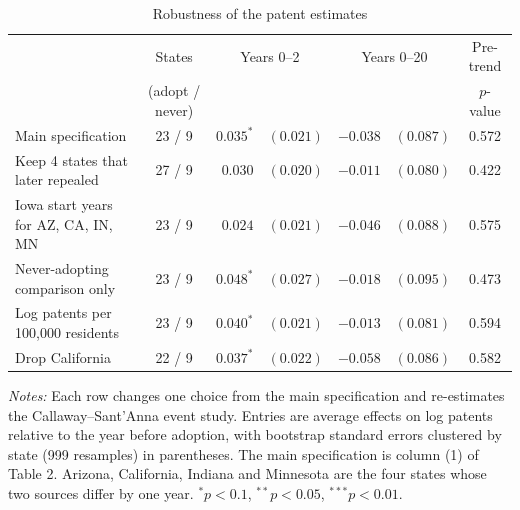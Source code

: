 \begin{table}[t]
\centering
\caption{Robustness of the patent estimates}
\label{tab:robustness}
\small
\begin{threeparttable}
\begin{tabular}{lcr@{\,}lr@{\,}lc}
\toprule
 & States & \multicolumn{2}{c}{Years 0--2} & \multicolumn{2}{c}{Years 0--20} & Pre-trend \\
 & (adopt / never) & \multicolumn{2}{c}{} & \multicolumn{2}{c}{} & $p$-value \\
\midrule
Main specification & 23 / 9 & $0.035^{*}$ & $(0.021)$ & $-0.038$ & $(0.087)$ & 0.572 \\
Keep 4 states that later repealed & 27 / 9 & $0.030$ & $(0.020)$ & $-0.011$ & $(0.080)$ & 0.422 \\
Iowa start years for AZ, CA, IN, MN & 23 / 9 & $0.024$ & $(0.021)$ & $-0.046$ & $(0.088)$ & 0.575 \\
Never-adopting comparison only & 23 / 9 & $0.048^{*}$ & $(0.027)$ & $-0.018$ & $(0.095)$ & 0.473 \\
Log patents per 100,000 residents & 23 / 9 & $0.040^{*}$ & $(0.021)$ & $-0.013$ & $(0.081)$ & 0.594 \\
Drop California & 22 / 9 & $0.037^{*}$ & $(0.022)$ & $-0.058$ & $(0.086)$ & 0.582 \\
\bottomrule
\end{tabular}
\begin{tablenotes}[flushleft]\footnotesize
\item \textit{Notes:} Each row changes one choice from the main specification and re-estimates the
Callaway--Sant'Anna event study. Entries are average effects on log patents relative to the year before
adoption, with bootstrap standard errors clustered by state (999 resamples) in parentheses.
The main specification is column (1) of Table 2. Arizona, California, Indiana and Minnesota are the four
states whose two sources differ by one year. $^{*}p<0.1$, $^{**}p<0.05$, $^{***}p<0.01$.
\end{tablenotes}
\end{threeparttable}
\end{table}
